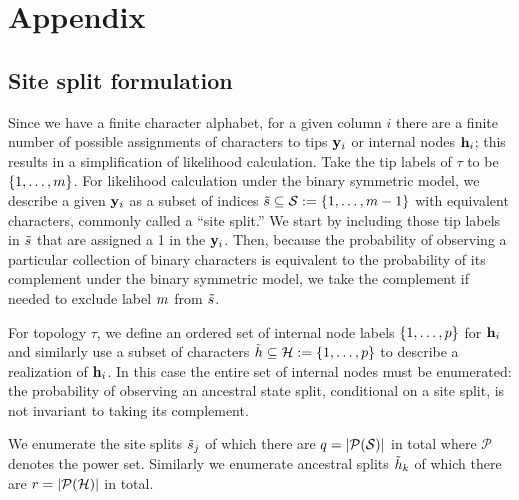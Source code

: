 \section*{Appendix}

\subsection*{Site split formulation}

Since we have a finite character alphabet, for a given column $i$ there are a finite number of possible assignments of characters to tips $\mathbf{y}_i$ or internal nodes $\mathbf{h}_i$; this results in a simplification of likelihood calculation.
Take the tip labels of $\tau$ to be $\{1,\ldots,m\}$.
For likelihood calculation under the binary symmetric model, we describe a given $\mathbf{y}_i$ as a subset of indices $\tilde{s}\subseteq\mathcal{S}:=\{1,\ldots,m-1\}$ with equivalent characters, commonly called a ``site split.''
We start by including those tip labels in $\tilde{s}$ that are assigned a 1 in the $\mathbf{y}_i$.
Then, because the probability of observing a particular collection of binary characters is equivalent to the probability of its complement under the binary symmetric model, we take the complement if needed to exclude label $m$ from $\tilde{s}$.

For topology $\tau$, we define an ordered set of internal node labels $\{1,\ldots,p\}$ for $\mathbf{h}_i$ and similarly use a subset of characters $\tilde{h}\subseteq\mathcal{H}:=\{1,\ldots,p\}$ to describe a realization of $\mathbf{h}_i$.
In this case the entire set of internal nodes must be enumerated: the probability of observing an ancestral state split, conditional on a site split, is not invariant to taking its complement.

We enumerate the site splits $\tilde{s}_j$ of which there are $q=|\mathcal{P}(\mathcal{S})|$ in total where $\mathcal{P}$ denotes the power set.
Similarly we enumerate ancestral splits $\tilde{h}_k$ of which there are $r=|\mathcal{P}(\mathcal{H})|$ in total.

